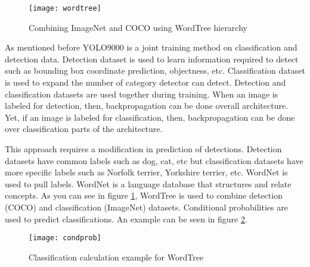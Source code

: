 \documentclass{article}
\begin{document}
\begin{enumerate}
    \begin{figure}
        \centering
        \texttt{[image: wordtree]}
        \caption{Combining ImageNet and COCO using WordTree hierarchy \cite{yolo9000cite}}
        \label{fig:wordtree1}
    \end{figure}
    
    As mentioned before YOLO9000 is a joint training method on classification and detection 
    data. Detection dataset is used to learn information required to detect such as bounding 
    box coordinate prediction, objectness, etc. Classification dataset is used to expand the 
    number of category detector can detect. Detection and classification datasets are used together 
    during training. When an image is labeled for detection, then, backpropagation 
    can be done overall architecture. Yet, if an image is labeled for classification, then, 
    backpropagation can be done over classification parts of the architecture. \par 
    
    This approach requires a modification in prediction of detections. Detection datasets have common 
    labels such as dog, cat, etc but classification datasets have more specific labels such as Norfolk 
    terrier, Yorkshire terrier, etc. WordNet is used to pull labels. WordNet is a language database that 
    structures and relate concepts. As you can see in figure \ref{fig:wordtree1}, WordTree is used to combine 
    detection (COCO) and classification (ImageNet) datasets. Conditional probabilities are used 
    to predict classifications. An example can be seen in figure \ref{fig:condprob1}.
    
    \begin{figure}
        \centering
        \texttt{[image: condprob]}
        \caption{Classification calculation example for WordTree \cite{yolo9000cite}}
        \label{fig:condprob1}
    \end{figure}
\end{enumerate}
\end{document}
